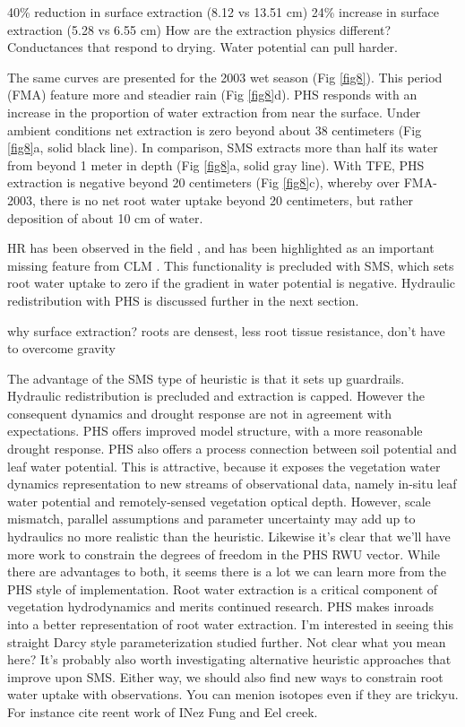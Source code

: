 \documentclass[draft,linenumbers]{agujournal}
\begin{document}
40\% reduction in surface extraction (8.12 vs 13.51 cm)
24\% increase in surface extraction (5.28 vs 6.55 cm)
How are the extraction physics different?
Conductances that respond to drying.
Water potential can pull harder.


The same curves are presented for the 2003 wet season (Fig \ref{fig8}).
This period (FMA) feature more and steadier rain (Fig \ref{fig8}d).
PHS responds with an increase in the proportion of water extraction from near the surface.
Under ambient conditions net extraction is zero beyond about 38 centimeters (Fig \ref{fig8}a, solid black line).
In comparison, SMS extracts more than half its water from beyond 1 meter in depth (Fig \ref{fig8}a, solid gray line).
With TFE, PHS extraction is negative beyond 20 centimeters (Fig \ref{fig8}c), whereby over FMA-2003,
there is no net root water uptake beyond 20 centimeters, but rather deposition of about 10 cm of water.

HR has been observed in the field \citep{oliveira2005}, and has been highlighted as an important missing feature from CLM \citep{lee2005}.
This functionality is precluded with SMS, which sets root water uptake to zero if the gradient in water potential is negative. 
Hydraulic redistribution with PHS is discussed further in the next section.

why surface extraction?
roots are densest, less root tissue resistance, don't have to overcome gravity

The advantage of the SMS type of heuristic is that it sets up guardrails.
Hydraulic redistribution is precluded and extraction is capped.
However the consequent dynamics and drought response are not in agreement with expectations.
PHS offers improved model structure, with a more reasonable drought response.
PHS also offers a process connection between soil potential and leaf water potential.
This is attractive, because it exposes the vegetation water dynamics representation to new streams of observational data, 
namely in-situ leaf water potential and remotely-sensed vegetation optical depth.
However, scale mismatch, parallel assumptions and parameter uncertainty may add up to hydraulics no more realistic than the heuristic.
Likewise it's clear that we'll have more work to constrain the degrees of freedom in the PHS RWU vector.
While there are advantages to both, it seems there is a lot we can learn more from the PHS style of implementation.
Root water extraction is a critical component of vegetation hydrodynamics and merits continued research.
PHS makes inroads into a better representation of root water extraction.
I'm interested in seeing this straight Darcy style parameterization studied further. Not clear what you mean here? 
It's probably also worth investigating alternative heuristic approaches that improve upon SMS.
Either way, we should also find new ways to constrain root water uptake with observations. You can menion isotopes even if they are trickyu. For instance cite reent work of INez Fung and Eel creek.
\end{document}
